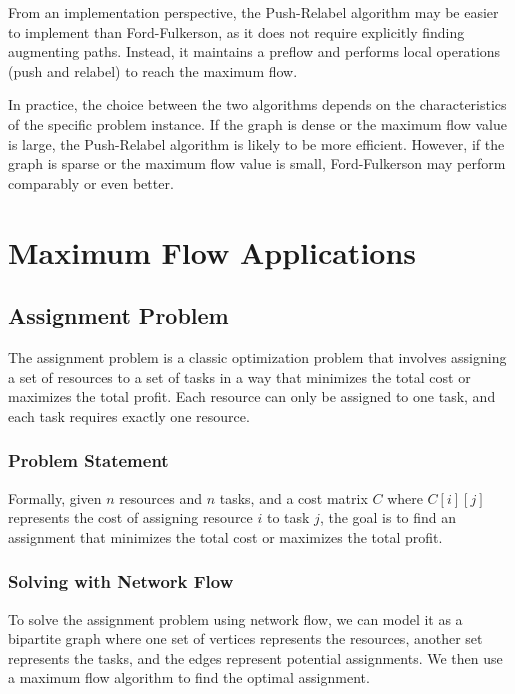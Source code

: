 \documentclass[12pt]{book} %
\begin{document}
From an implementation perspective, the Push-Relabel algorithm may be easier to implement than Ford-Fulkerson, as it does not require explicitly finding augmenting paths. Instead, it maintains a preflow and performs local operations (push and relabel) to reach the maximum flow.

In practice, the choice between the two algorithms depends on the characteristics of the specific problem instance. If the graph is dense or the maximum flow value is large, the Push-Relabel algorithm is likely to be more efficient. However, if the graph is sparse or the maximum flow value is small, Ford-Fulkerson may perform comparably or even better.


\section{Maximum Flow Applications}

\subsection{Assignment Problem}
The assignment problem is a classic optimization problem that involves assigning a set of resources to a set of tasks in a way that minimizes the total cost or maximizes the total profit. Each resource can only be assigned to one task, and each task requires exactly one resource.
\subsubsection{Problem Statement}
Formally, given \(n\) resources and \(n\) tasks, and a cost matrix \(C\) where \(C[i][j]\) represents the cost of assigning resource \(i\) to task \(j\), the goal is to find an assignment that minimizes the total cost or maximizes the total profit.

\subsubsection{Solving with Network Flow}

To solve the assignment problem using network flow, we can model it as a bipartite graph where one set of vertices represents the resources, another set represents the tasks, and the edges represent potential assignments. We then use a maximum flow algorithm to find the optimal assignment.
\end{document}

